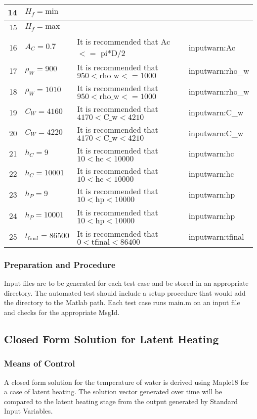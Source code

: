 \documentclass[12pt]{article}
\begin{document}
\begin{center}
\begin{longtable}{ | r | p{3cm} | p{5cm} | p{4cm} |}
	14 & $H_f = \text{min}$ & & \\ \hline
	15 & $H_f = \text{max}$ & & \\ \hline
	16 & $A_C = 0.7$ & It is recommended that Ac $<=$ pi*D/2 & inputwarn:Ac\\ \hline
	17 & $\rho_W = 900$ & It is recommended that $950 < \text{rho\_{w}} <= 1000$ & inputwarn:rho\_{w} \\ \hline
	18 & $\rho_W = 1010$ & It is recommended that $950 < \text{rho\_{w}} <= 1000$ & inputwarn:rho\_{w} \\ \hline
	19 & $C_W = 4160$ & It is recommended that $4170 < \text{C\_{w}} < 4210$ & inputwarn:C\_{w} \\ \hline
	20 & $C_W = 4220$ & It is recommended that $4170 < \text{C\_{w}} < 4210$ & inputwarn:C\_{w} \\ \hline
	21 & $h_C = 9$ & It is recommended that $10 < \text{hc} < 10000$ & inputwarn:hc \\ \hline
	22 & $h_C = 10001$ & It is recommended that $10 < \text{hc} < 10000$ & inputwarn:hc \\ \hline
	23 & $h_P = 9$ & It is recommended that $10 < \text{hp} < 10000$ & inputwarn:hp \\ \hline
	24 & $h_P = 10001$ & It is recommended that $10 < \text{hp} < 10000$ & inputwarn:hp \\ \hline
	25 & $t_{\text{final}} = 86500$ & It is recommended that $0 < \text{tfinal} < 86400$ & inputwarn:tfinal \\ \hline
	\end{longtable}
\end{center}

\subsubsection{Preparation and Procedure}
Input files are to be generated for each test case and be stored in an appropriate
 directory. The automated test should include a setup procedure that would add 
 the directory to the Matlab path. Each test case runs main.m on an input file
  and checks for the appropriate MsgId. 

\subsection{Closed Form Solution for Latent Heating}
\subsubsection{Means of Control}
A closed form solution for the temperature of water is derived using Maple18 for
a case of latent heating. The solution vector generated over time will be 
compared to the latent heating stage from the output generated by Standard Input Variables.
\end{document}
